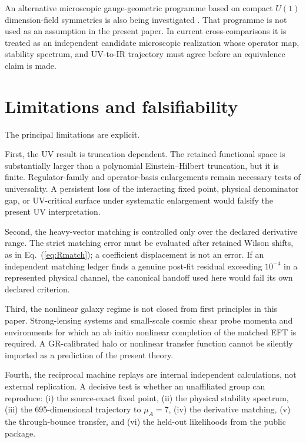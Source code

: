 \documentclass[12pt]{iopart}
\begin{document}
An alternative microscopic gauge-geometric programme based on compact $U(1)$ dimension-field symmetries is also being investigated \cite{PartanenTulkki2025}.  That programme is not used as an assumption in the present paper.  In current cross-comparisons it is treated as an independent candidate microscopic realization whose operator map, stability spectrum, and UV-to-IR trajectory must agree before an equivalence claim is made.

\section{Limitations and falsifiability}
\label{sec:limits}

The principal limitations are explicit.

First, the UV result is truncation dependent.  The retained functional space is substantially larger than a polynomial Einstein--Hilbert truncation, but it is finite.  Regulator-family and operator-basis enlargements remain necessary tests of universality.  A persistent loss of the interacting fixed point, physical denominator gap, or UV-critical surface under systematic enlargement would falsify the present UV interpretation.

Second, the heavy-vector matching is controlled only over the declared derivative range.  The strict matching error must be evaluated after retained Wilson shifts, as in Eq.~(\ref{eq:Rmatch}); a coefficient displacement is not an error.  If an independent matching ledger finds a genuine post-fit residual exceeding $10^{-4}$ in a represented physical channel, the canonical handoff used here would fail its own declared criterion.

Third, the nonlinear galaxy regime is not closed from first principles in this paper.  Strong-lensing systems and small-scale cosmic shear probe momenta and environments for which an ab initio nonlinear completion of the matched EFT is required.  A GR-calibrated halo or nonlinear transfer function cannot be silently imported as a prediction of the present theory.

Fourth, the reciprocal machine replays are internal independent calculations, not external replication.  A decisive test is whether an unaffiliated group can reproduce: (i) the source-exact fixed point, (ii) the physical stability spectrum, (iii) the 695-dimensional trajectory to $\mu_A=7$, (iv) the derivative matching, (v) the through-bounce transfer, and (vi) the held-out likelihoods from the public package.
\end{document}
